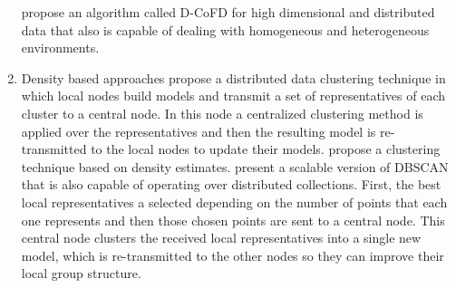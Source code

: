 \documentclass[10pt]{article}
\begin{document}
\begin{enumerate}
\cite{LZO03} propose an algorithm called D-CoFD for high dimensional and distributed data that also is capable of dealing with homogeneous and heterogeneous environments.

\item Density based approaches
\cite{JKP03} propose a distributed data clustering technique in which local nodes build models and transmit a set of representatives of each cluster to a central node. In this node a centralized clustering method is applied over the representatives and then the resulting model is re-transmitted to the local nodes to update their models.
\cite{KLM03} propose a clustering technique based on density estimates.
\cite{JKP04} present a scalable version of DBSCAN that is also capable of operating over distributed collections. First, the best local representatives a selected depending on the number of points that each one represents and then those chosen points are sent to a central node. This central node clusters the received local representatives into a single new model, which is re-transmitted to the other nodes so they can improve their local group structure.


\end{enumerate}
\end{document}
